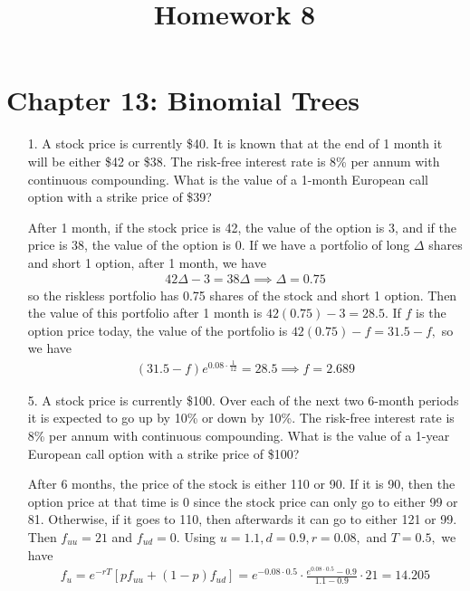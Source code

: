 \documentclass{article}
\begin{document}
\title{Homework 8}
\maketitle
\thispagestyle{fancy}

\section*{Chapter 13: Binomial Trees}

\begin{itemize}
	\item[1.] A stock price is currently \$40. It is known that at the end of 1 month it will be either \$42 or \$38. The risk-free interest rate is 8\% per annum with continuous compounding. What is the value of a 1-month European call option with a strike price of \$39?
		\begin{soln}
			After 1 month, if the stock price is 42, the value of the option is 3, and if the price is 38, the value of the option is 0. If we have a portfolio of long $\Delta$ shares and short 1 option, after 1 month, we have
			\begin{align*}
				42\Delta - 3 = 38\Delta \implies \Delta = 0.75
			\end{align*}
			so the riskless portfolio has 0.75 shares of the stock and short 1 option. Then the value of this portfolio after 1 month is $42(0.75)-3 = 28.5.$ If $f$ is the option price today, the value of the portfolio is $42(0.75)-f = 31.5-f,$ so we have
			\begin{align*}
				(31.5-f)e^{0.08\cdot \frac{1}{12}} = 28.5 \implies f = \boxed{2.689}
			\end{align*}
			\end{soln}

	\item[5.] A stock price is currently \$100. Over each of the next two 6-month periods it is expected to go up by 10\% or down by 10\%. The risk-free interest rate is 8\% per annum with continuous compounding. What is the value of a 1-year European call option with a strike price of \$100?
		\begin{soln}
			After 6 months, the price of the stock is either 110 or 90. If it is 90, then the option price at that time is 0 since the stock price can only go to either 99 or 81. Otherwise, if it goes to 110, then afterwards it can go to either 121 or 99. Then $f_{uu}=21$ and $f_{ud}=0.$ Using $u=1.1, d=0.9, r=0.08,$ and $T=0.5,$ we have 
			\begin{align*}
				f_u = e^{-rT} [pf_{uu} + (1-p) f_{ud}] = e^{-0.08\cdot 0.5}\cdot \frac{e^{0.08\cdot 0.5} - 0.9}{1.1-0.9}\cdot 21 = 14.205
			\end{align*}
			

\end{soln}
\end{itemize}
\end{document}
